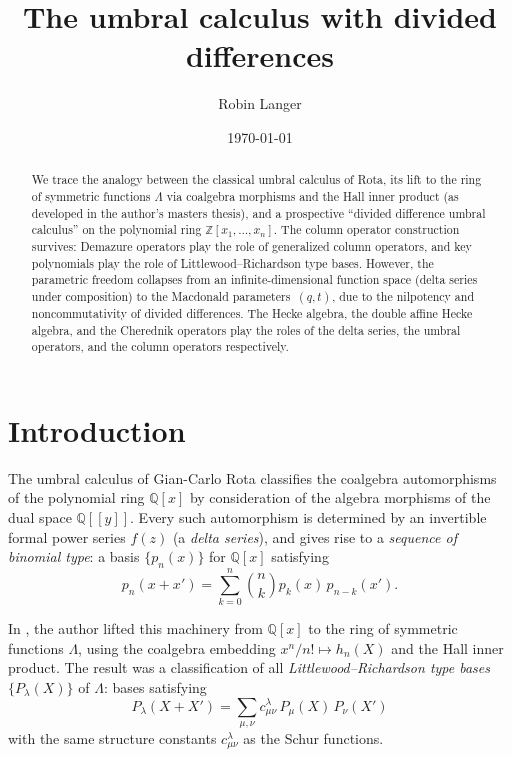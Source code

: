 \documentclass[11pt]{amsart}
\title{The umbral calculus with divided differences}
\author{Robin Langer}
\date{\today}
\theoremstyle{definition}
\newcommand{\Z}{\mathbb{Z}}
\newcommand{\Q}{\mathbb{Q}}
\begin{document}
\begin{abstract}
We trace the analogy between the classical umbral calculus of Rota,
its lift to the ring of symmetric functions $\Lambda$ via coalgebra
morphisms and the Hall inner product (as developed in the author's
masters thesis), and a prospective ``divided difference umbral
calculus'' on the polynomial ring $\Z[x_1,\dots,x_n]$. The column
operator construction survives: Demazure operators play the role of
generalized column operators, and key polynomials play the role of
Littlewood--Richardson type bases. However, the parametric freedom
collapses from an infinite-dimensional function space (delta series
under composition) to the Macdonald parameters~$(q,t)$, due to
the nilpotency and noncommutativity of divided differences. The
Hecke algebra, the double affine Hecke algebra, and the Cherednik
operators play the roles of the delta series, the umbral operators,
and the column operators respectively.
\end{abstract}

\maketitle

\tableofcontents

\section{Introduction}

The umbral calculus of Gian-Carlo Rota \cite{Rota,Roman} classifies
the coalgebra automorphisms of the polynomial ring $\Q[x]$ by
consideration of the algebra morphisms of the dual space
$\Q[[y]]$. Every such automorphism is determined by an invertible
formal power series $f(z)$ (a \emph{delta series}), and gives rise
to a \emph{sequence of binomial type}: a basis $\{p_n(x)\}$ for
$\Q[x]$ satisfying
\[
  p_n(x + x') = \sum_{k=0}^{n} \binom{n}{k} p_k(x)\, p_{n-k}(x').
\]

In \cite{Langer}, the author lifted this machinery from $\Q[x]$ to
the ring of symmetric functions $\Lambda$, using the coalgebra
embedding $x^n/n! \mapsto h_n(X)$ and the Hall inner product. The
result was a classification of all \emph{Littlewood--Richardson type
bases} $\{P_\lambda(X)\}$ of $\Lambda$: bases satisfying
\[
  P_\lambda(X + X') = \sum_{\mu,\nu} c^\lambda_{\mu\nu}\, P_\mu(X)\, P_\nu(X')
\]
with the same structure constants $c^\lambda_{\mu\nu}$ as the Schur
functions.
\end{document}
